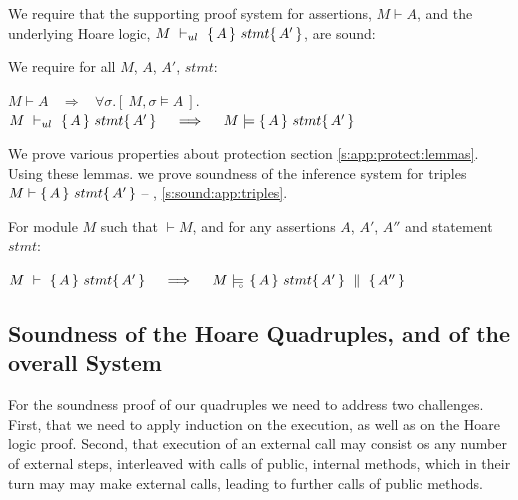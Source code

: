 We require  that the supporting proof system for assertions, $M\vdash A$, and the  underlying Hoare logic, $M\ \vdash_{ul}\  \triple A {stmt} {A'}$, are sound:
\begin{axiom}
\label{lemma:axiom:enc:assert:ul}
\label{ax:ul:sound}
We require for all $M$, $A$, $A'$, $stmt$:
\begin{center}
$M \vdash A   \ \ \ \  \Longrightarrow  \ \ \ \  \forall \sigma.[\ M, \sigma \models A\ ]$.\\
%
%
{$M\ \vdash_{ul}\   \{\, A \, \}\ stmt \{\, A' \, \}  \ \ \ \  \Longrightarrow  \ \ \ \ M \models   \{\, A \, \}\ stmt \{\, A' \, \}$ }
 \end{center}
\end{axiom}

\noindent
\label{sect:prove:triples:sound}
We prove various properties about protection
\cf section \ref{s:app:protect:lemmas}.
Using these lemmas. we prove soundness of the inference system for triples $M \vdash   \{\, A \, \}\ stmt \{\, A' \, \} $ -- \cf \A, \ref{s:sound:app:triples}.

 
 


\begin{Theorem}
\label{l:triples:sound}
For module  $M$ %
such that  $\vdash M$, and for any assertions $A$,  $A'$, $A''$ and statement  $stmt$:
\begin{center}
$M\ \vdash\  \triple A {stmt} {A'}  \ \ \ \  \Longrightarrow  \ \ \ \ \satisfiesD {M} {\quadruple {A} {stmt} {A'} {A''}}$
\end{center}
\end{Theorem}
 



\subsection{Soundness of the Hoare Quadruples, and of the overall System}

For the soundness proof of our quadruples we need to address two challenges. 
First, that we need to apply induction on the execution, as well as on the Hoare logic proof. 
Second, that execution of an external call may consist os any number of external steps, interleaved with calls of public, internal methods, which in their turn may may make external calls, leading to further calls of public methods.



